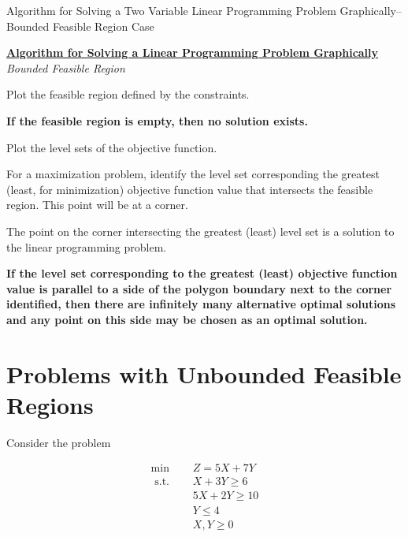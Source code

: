\begin{algorithm}[H]
\caption{Algorithm for Solving a Two Variable Linear Programming Problem Graphically--Bounded Feasible Region Case}
\label{alg:GraphLPBoundedEmpty}
\begin{center}
\begin{minipage}[t]{\textwidth-1em}
\underline{\textbf{Algorithm for Solving a Linear Programming Problem Graphically}}\\
\textit{Bounded Feasible Region}
\begin{enumerate*}
\item Plot the feasible region defined by the constraints.
\item \textbf{If the feasible region is empty, then no solution exists.}
\item Plot the level sets of the objective function.
\item For a maximization problem, identify the level set corresponding the greatest (least, for minimization) objective function value that intersects the feasible region. This point will be at a corner. 
\item The point on the corner intersecting the greatest (least) level set is a solution to the linear programming problem. 
\item \textbf{If the level set corresponding to the greatest (least) objective function value is parallel to a side of the polygon boundary next to the corner identified, then there are infinitely many alternative optimal solutions and any point on this side may be chosen as an optimal solution.} 
\end{enumerate*}
\end{minipage}
\end{center}
\end{algorithm}

\section{Problems with Unbounded Feasible Regions}
Consider the problem

\begin{align*}
\min \quad & Z =5 X+7 Y  \\ 
\text { s.t. } \quad & X+3 Y \geq 6 \\ 
&5 X+ 2 Y \geq 10 \\ 
&Y  \leq 4 \\ 
&X, Y  \geq 0 
\end{align*}

